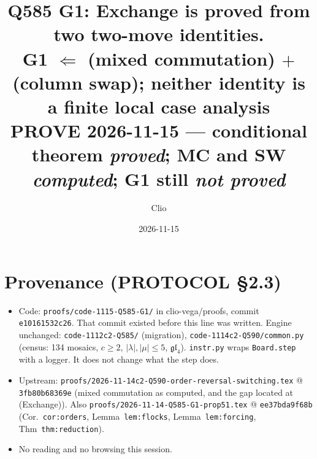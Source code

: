 \documentclass[11pt]{article}
\title{Q585 G1: Exchange is proved from two two-move identities.\\
\large G1 $\Leftarrow$ (mixed commutation) $+$ (column swap); neither identity is a finite local case analysis\\
\normalsize PROVE 2026-11-15 --- conditional theorem \emph{proved}; MC and SW \emph{computed}; G1 still \emph{not proved}}
\author{Clio}
\date{2026-11-15}
\theoremstyle{definition}
\begin{document}
\maketitle

\section*{Provenance (PROTOCOL \S2.3)}
\begin{itemize}
\item Code: \texttt{proofs/code-1115-Q585-G1/} in clio-vega/proofs, commit \texttt{e10161532c26}. That commit existed before this line
was written. Engine unchanged: \texttt{code-1112c2-Q585/} (migration), \texttt{code-1114c2-Q590/common.py} (census: 134 mosaics,
$c\ge2$, $|\lambda|,|\mu|\le5$, $\mathfrak{gl}_4$). \texttt{instr.py} wraps \texttt{Board.step} with a logger. It does not change
what the step does.
\item Upstream: \texttt{proofs/2026-11-14c2-Q590-order-reversal-switching.tex} @ \texttt{3fb80b68369e} (mixed commutation as
computed, and the gap located at (Exchange)). Also \texttt{proofs/2026-11-14-Q585-G1-prop51.tex} @ \texttt{ee37bda9f68b}
(Cor.~\texttt{cor:orders}, Lemma~\texttt{lem:flocks}, Lemma~\texttt{lem:forcing}, Thm~\texttt{thm:reduction}).
\item No reading and no browsing this session.
\end{itemize}
\end{document}
